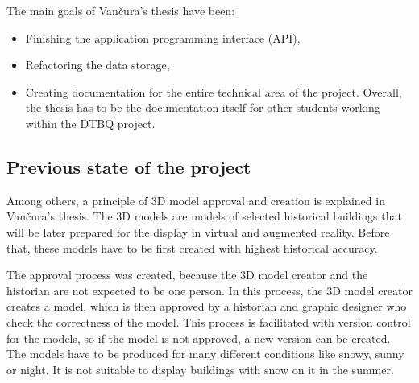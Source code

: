 \documentclass[thesis=B,english]{FITthesis}[2019/12/23]
\begin{document}
       The main goals of Vančura's thesis have been:
        \begin{itemize}
            \item Finishing the application programming interface (API),
            \item Refactoring the data storage,
            \item Creating documentation for the entire technical area of the project. Overall, the thesis has to be the documentation itself for other students working within the DTBQ project.
        \end{itemize}
                
        \subsection{Previous state of the project}
            Among others, a principle of 3D model approval and creation is explained in Vančura's thesis. The 3D models are models of selected historical buildings that will be later prepared for the display in virtual and augmented reality. Before that, these models have to be first created with highest historical accuracy.
            
            The approval process was created, because the 3D model creator and the historian are not expected to be one person. In this process, the 3D model creator creates a model, which is then approved by a historian and graphic designer who check the correctness of the model. This process is facilitated with version control for the models, so if the model is not approved, a new version can be created. The models have to be produced for many different conditions like snowy, sunny or night. It is not suitable to display buildings with snow on it in the summer.
            
\end{document}

